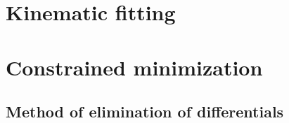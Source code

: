 \documentclass{webofc}
\begin{document}

%



\section{Kinematic fitting}

\section{Constrained minimization}


%   
%   
  \subsection{Method of elimination of differentials}
  
\end{document}
